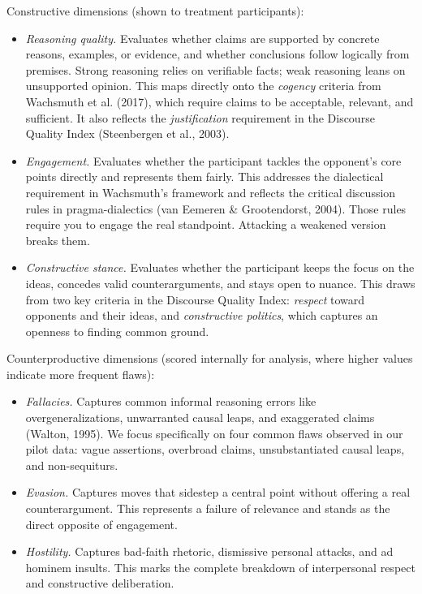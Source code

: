\documentclass[11pt]{article}
\begin{document}
Constructive dimensions (shown to treatment participants):
\begin{itemize}[nosep]
  \item \emph{Reasoning quality.} Evaluates whether claims are supported by concrete reasons, examples, or evidence, and whether conclusions follow logically from premises. Strong reasoning relies on verifiable facts; weak reasoning leans on unsupported opinion. This maps directly onto the \emph{cogency} criteria from Wachsmuth et al. (2017), which require claims to be acceptable, relevant, and sufficient. It also reflects the \emph{justification} requirement in the Discourse Quality Index (Steenbergen et al., 2003).
  \item \emph{Engagement.} Evaluates whether the participant tackles the opponent's core points directly and represents them fairly. This addresses the dialectical requirement in Wachsmuth's framework and reflects the critical discussion rules in pragma-dialectics (van Eemeren \& Grootendorst, 2004). Those rules require you to engage the real standpoint. Attacking a weakened version breaks them.
  \item \emph{Constructive stance.} Evaluates whether the participant keeps the focus on the ideas, concedes valid counterarguments, and stays open to nuance. This draws from two key criteria in the Discourse Quality Index: \emph{respect} toward opponents and their ideas, and \emph{constructive politics}, which captures an openness to finding common ground.
\end{itemize}

Counterproductive dimensions (scored internally for analysis, where higher values indicate more frequent flaws):
\begin{itemize}[nosep]
  \item \emph{Fallacies.} Captures common informal reasoning errors like overgeneralizations, unwarranted causal leaps, and exaggerated claims (Walton, 1995). We focus specifically on four common flaws observed in our pilot data: vague assertions, overbroad claims, unsubstantiated causal leaps, and non-sequiturs.
  \item \emph{Evasion.} Captures moves that sidestep a central point without offering a real counterargument. This represents a failure of relevance and stands as the direct opposite of engagement.
  \item \emph{Hostility.} Captures bad-faith rhetoric, dismissive personal attacks, and ad hominem insults. This marks the complete breakdown of interpersonal respect and constructive deliberation.
\end{itemize}
\end{document}
